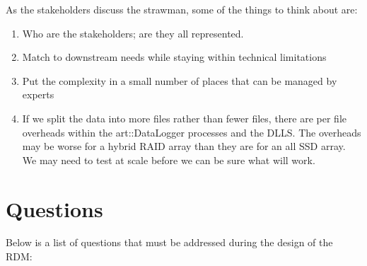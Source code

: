 As the stakeholders discuss the strawman, some of the things to think about are:

\begin{enumerate}
  \item Who are the stakeholders; are they all represented.
  \item Match to downstream needs while staying within technical limitations
  \item Put the complexity in a small number of places that can be managed by experts
  \item If we split the data into more files rather than fewer files, there are per file
    overheads within the {\code art::DataLogger} processes and the DLLS.  The overheads
    may be worse for a hybrid RAID array than they are for an all SSD array.
    We may need to test at scale before we can be sure what will work.
\end{enumerate}




\chapter{Questions}
\label{ch:questions}

Below is a list of questions that must be addressed during the design of the RDM:


